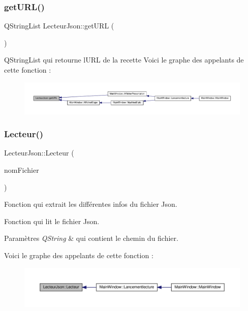 \subsubsection{\texorpdfstring{get\+U\+R\+L()}{getURL()}}
{\footnotesize\ttfamily Q\+String\+List Lecteur\+Json\+::get\+U\+RL (\begin{DoxyParamCaption}{ }\end{DoxyParamCaption})\hspace{0.3cm}{\ttfamily [inline]}}

Q\+String\+List qui retourne l\textquotesingle{}U\+RL de la recette Voici le graphe des appelants de cette fonction \+:
\nopagebreak
\begin{figure}[H]
\begin{center}
\leavevmode
\includegraphics[width=350pt]{class_lecteur_json_a4ceacda970b2b838bb41211decdd799f_icgraph}
\end{center}
\end{figure}
\mbox{\label{class_lecteur_json_a6b74dbecd8cb87168fb2d36bc1a22f2b}} 
\subsubsection{\texorpdfstring{Lecteur()}{Lecteur()}}
{\footnotesize\ttfamily Lecteur\+Json\+::\+Lecteur (\begin{DoxyParamCaption}\item[{Q\+String}]{nom\+Fichier }\end{DoxyParamCaption})}



Fonction qui extrait les différentes infos du fichier Json. 

Fonction qui lit le fichier Json.


\begin{DoxyParams}{Paramètres}
{\em Q\+String} & qui contient le chemin du fichier. \\
\hline
\end{DoxyParams}
Voici le graphe des appelants de cette fonction \+:
\nopagebreak
\begin{figure}[H]
\begin{center}
\leavevmode
\includegraphics[width=350pt]{class_lecteur_json_a6b74dbecd8cb87168fb2d36bc1a22f2b_icgraph}
\end{center}
\end{figure}


